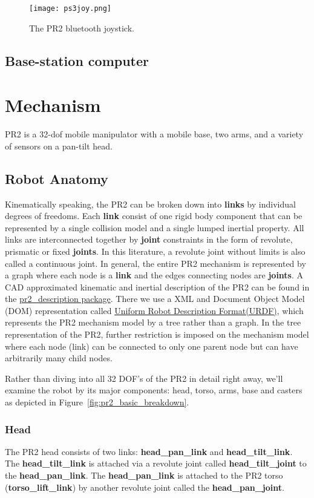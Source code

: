 \begin{figure}[h]
\centering
\texttt{[image: ps3joy.png]}
\caption{The PR2 bluetooth joystick.}
\label{fig:ps3joy}
\end{figure}

\subsection{Base-station computer}

\section{Mechanism}
PR2 is a 32-dof mobile manipulator with a mobile base, two arms, and a variety of sensors on a pan-tilt head.

\subsection{Robot Anatomy}

Kinematically speaking, the PR2 can be broken down into {\bf links} by individual degrees of freedoms.  Each {\bf link} consist of one
rigid body component that can be represented by a single collision model and a single lumped inertial property.
All links are interconnected together by {\bf joint} constraints in the form of revolute, prismatic or fixed {\bf joints}.
In this literature, a revolute joint without limits is also called a continuous joint.
In general, the entire PR2 mechanism is represented by a graph where each node is a {\bf link} and the edges connecting nodes are {\bf joints}.
A CAD approximated kinematic and inertial description of the PR2 can be found in the \href{http://www.ros.org/wiki/pr2_description}{pr2\_description package}.
There we use a XML and Document Object Model (DOM) representation called \href{http://www.ros.org/wiki/urdf}{Uniform Robot Description Format(URDF)}, which represents the PR2 mechanism model
by a tree rather than a graph.  In the tree representation of the PR2, further restriction is imposed on the mechanism model where each node (link) can be connected to only one parent node but can have arbitrarily many child nodes.

Rather than diving into all 32 DOF's of the PR2 in detail right away, we'll examine the robot by its major components:  head, torso, arms, base and casters as depicted in Figure~\ref{fig:pr2_basic_breakdown}.

\subsubsection{Head}
The PR2 head consists of two links: {\bf head\_pan\_link} and {\bf head\_tilt\_link}.  The {\bf head\_tilt\_link} is attached via a revolute joint called {\bf head\_tilt\_joint} to the {\bf head\_pan\_link}.
The {\bf head\_pan\_link} is attached to the PR2 torso ({\bf torso\_lift\_link}) by another revolute joint called the {\bf head\_pan\_joint}.


